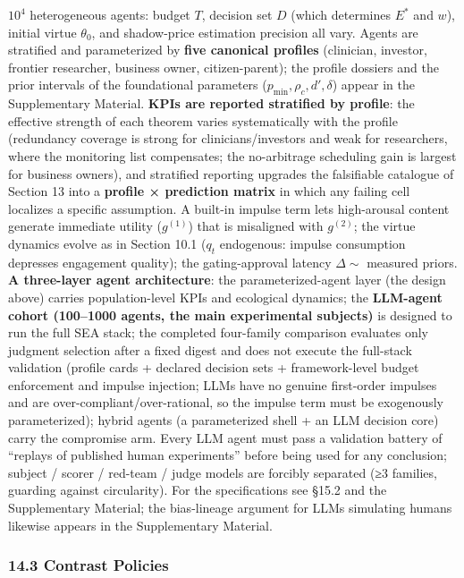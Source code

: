 \documentclass[
  11pt]{article}
\begin{document}
\(10^4\) heterogeneous agents: budget \(T\), decision set \(D\) (which
determines \(E^*\) and \(w\)), initial virtue \(\theta_0\), and
shadow-price estimation precision all vary. Agents are stratified and
parameterized by \textbf{five canonical profiles} (clinician, investor,
frontier researcher, business owner, citizen-parent); the profile
dossiers and the prior intervals of the foundational parameters
(\(p_{\min}, \rho_c, d', \delta\)) appear in the Supplementary Material.
\textbf{KPIs are reported stratified by profile}: the effective strength
of each theorem varies systematically with the profile (redundancy
coverage is strong for clinicians/investors and weak for researchers,
where the monitoring list compensates; the no-arbitrage scheduling gain
is largest for business owners), and stratified reporting upgrades the
falsifiable catalogue of Section 13 into a \textbf{profile × prediction
matrix} in which any failing cell localizes a specific assumption. A
built-in impulse term lets high-arousal content generate immediate
utility (\(g^{(1)}\)) that is misaligned with \(g^{(2)}\); the virtue
dynamics evolve as in Section 10.1 (\(q_t\) endogenous: impulse
consumption depresses engagement quality); the gating-approval latency
\(\Delta \sim\) measured priors. \textbf{A three-layer agent
architecture}: the parameterized-agent layer (the design above) carries
population-level KPIs and ecological dynamics; the \textbf{LLM-agent
cohort (100--1000 agents, the main experimental subjects)} is designed
to run the full SEA stack; the completed four-family comparison
evaluates only judgment selection after a fixed digest and does not
execute the full-stack validation (profile cards + declared decision
sets + framework-level budget enforcement and impulse injection; LLMs
have no genuine first-order impulses and are
over-compliant/over-rational, so the impulse term must be exogenously
parameterized); hybrid agents (a parameterized shell + an LLM decision
core) carry the compromise arm. Every LLM agent must pass a validation
battery of ``replays of published human experiments'' before being used
for any conclusion; subject / scorer / red-team / judge models are
forcibly separated (≥3 families, guarding against circularity). For the
specifications see §15.2 and the Supplementary Material; the
bias-lineage argument for LLMs simulating humans likewise appears in the
Supplementary Material.

\subsubsection{14.3 Contrast Policies}\label{contrast-policies}
\end{document}
